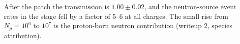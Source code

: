 After the patch the transmission is $1.00\pm0.02$, and the neutron-source event rates in the \gfour{} stage fell by a factor of 5--6 at all charges. The small rise from $N_p=10^6$ to $10^7$ is the proton-born neutron contribution (writeup 2, species attribution).




